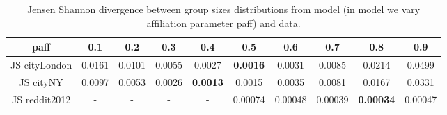 \begin{table}[]
	\centering
	\begin{tabular}{c|c|c|c | c|c |c| c| c | c}
		
		paff & 0.1 & 0.2 & 0.3 & 0.4 & 0.5 & 0.6 & 0.7 & 0.8 & 0.9  \\
		\hline
		JS cityLondon & 0.0161 & 	0.0101  &	0.0055 &	0.0027  &	\textbf{0.0016} & 	0.0031 & 	0.0085  &	0.0214 & 	0.0499 \\
		JS cityNY & 0.0097 &	0.0053 & 	0.0026 &	\textbf{0.0013} & 	0.0015 & 	0.0035 & 	0.0081 & 	0.0167 &	0.0331 \\
		JS reddit2012 & - & - & - & - &  0.00074 & 0.00048 & 0.00039 & \textbf{0.00034} & 0.00047 \\
	\end{tabular}
	\caption{Jensen Shannon divergence between group sizes distributions from model (in model we vary affiliation parameter paff) and data. }
	\label{tab:my_label}
\end{table}



